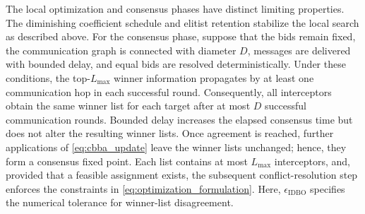 \documentclass[lettersize,journal]{IEEEtran}
\newcommand{\hladd}[1]{{\color{blue}#1}}
\begin{document}
\hladd{The local optimization and consensus phases have distinct limiting
properties. The diminishing coefficient schedule and elitist retention
stabilize the local search as described above. For the consensus phase,
suppose that the bids remain fixed, the communication graph is connected
with diameter $D$, messages are delivered with bounded delay, and equal bids
are resolved deterministically. Under these conditions, the top-$L_{\max}$
winner information propagates by at least one communication hop in each
successful round. Consequently, all interceptors obtain the same winner list
for each target after at most $D$ successful communication rounds. Bounded
delay increases the elapsed consensus time but does not alter the resulting
winner lists. Once agreement is reached, further applications of
\eqref{eq:cbba_update} leave the winner lists unchanged; hence, they form a
consensus fixed point. Each list contains at most $L_{\max}$ interceptors, and,
provided that a feasible assignment exists, the subsequent conflict-resolution
step enforces the constraints in \eqref{eq:optimization_formulation}. Here,
$\epsilon_{\mathrm{IDBO}}$ specifies the numerical tolerance for winner-list
disagreement.}
\end{document}
